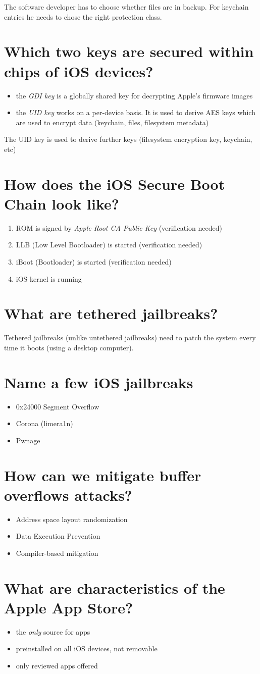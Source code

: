 \documentclass[twocolumn]{article}
\newcommand{\question}[1]{\section{#1}}
\begin{document}
The software developer has to choose whether files are in backup. For keychain entries he needs to chose the right protection class.

\question{Which two keys are secured within chips of iOS devices?}
%
\begin{itemize}
  \item the \emph{GDI key} is a globally shared key for decrypting Apple's firmware images
  \item the \emph{UID key} works on a per-device basis. It is used to derive AES keys which are used to encrypt data (keychain, files, filesystem metadata)
\end{itemize}

The UID key is used to derive further keys (filesystem encryption key, keychain, etc)

\question{How does the iOS Secure Boot Chain look like?}
%
\begin{enumerate}
  \item ROM is signed by \emph{Apple Root CA Public Key} (verification needed)
  \item LLB (Low Level Bootloader) is started (verification needed)
  \item iBoot (Bootloader) is started (verification needed)
  \item iOS kernel is running
\end{enumerate}

\question{What are tethered jailbreaks?}
%
Tethered jailbreaks (unlike untethered jailbreaks) need to patch the system every time it boots (using a desktop computer).

\question{Name a few iOS jailbreaks}
%
\begin{itemize}
  \item 0x24000 Segment Overflow
  \item Corona (limera1n)
  \item Pwnage
\end{itemize}

\question{How can we mitigate buffer overflows attacks?}
%
\begin{itemize}
  \item Address space layout randomization
  \item Data Execution Prevention
  \item Compiler-based mitigation
\end{itemize}

\question{What are characteristics of the Apple App Store?}
%
\begin{itemize}
  \item the \emph{only} source for apps
  \item preinstalled on all iOS devices, not removable
  \item only reviewed apps offered
\end{itemize}
\end{document}
